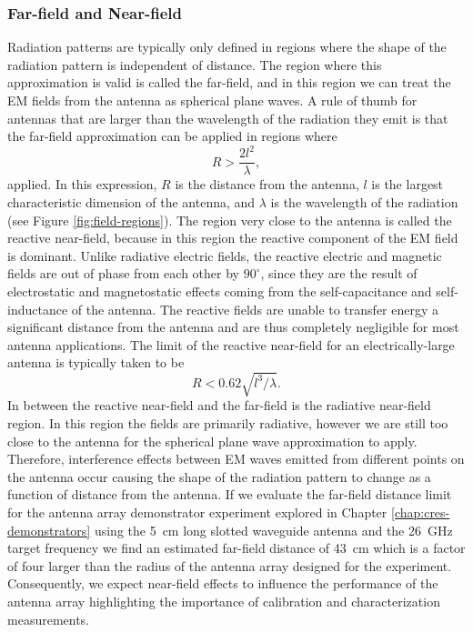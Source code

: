 \subsubsection{Far-field and Near-field}
Radiation patterns are typically only defined in regions where the shape of the radiation pattern is independent of distance. The region where this approximation is valid is called the far-field, and in this region we can treat the EM fields from the antenna as spherical plane waves. A rule of thumb for antennas that are larger than the wavelength of the radiation they emit is that the far-field approximation can be applied in regions where
\begin{equation}
    R > \frac{2l^2}{\lambda},
\end{equation}
applied. In this expression, $R$ is the distance from the antenna, $l$ is the largest characteristic dimension of the antenna, and $\lambda$ is the wavelength of the radiation (see Figure \ref{fig:field-regions}). The region very close to the antenna is called the reactive near-field, because in this region the reactive component of the EM field is dominant. Unlike radiative electric fields, the reactive electric and magnetic fields are out of phase from each other by $90^\circ$, since they are the result of electrostatic and magnetostatic effects coming from the self-capacitance and self-inductance of the antenna. The reactive fields are unable to transfer energy a significant distance from the antenna and are thus completely negligible for most antenna applications. The limit of the reactive near-field for an electrically-large antenna is typically taken to be
\begin{equation}
    R<0.62\sqrt{l^3/\lambda}.
\end{equation}
In between the reactive near-field and the far-field is the radiative near-field region. In this region the fields are primarily radiative, however we are still too close to the antenna for the spherical plane wave approximation to apply. Therefore, interference effects between EM waves emitted from different points on the antenna occur causing the shape of the radiation pattern to change as a function of distance from the antenna. If we evaluate the far-field distance limit for the antenna array demonstrator experiment explored in Chapter \ref{chap:cres-demonstrators} using the 5~cm long slotted waveguide antenna and the 26~GHz target frequency we find an estimated far-field distance of 43~cm which is a factor of four larger than the radius of the antenna array designed for the experiment. Consequently, we expect near-field effects to influence the performance of the antenna array highlighting the importance of calibration and characterization measurements.

